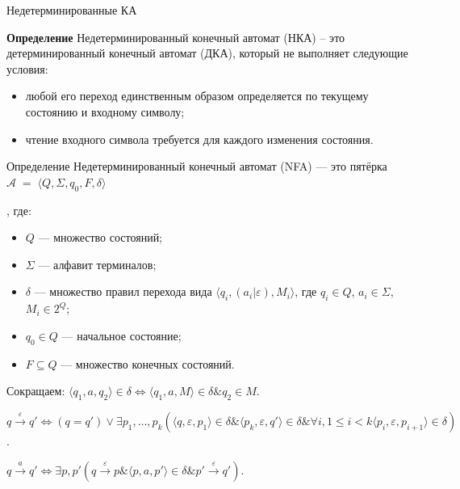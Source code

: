 \documentclass[mathserif]{beamer}
\def\logor{\mathrel{\vee}} %
\def\logand{\mathrel{\&}}
\def\iff{\mathrel{\Leftrightarrow}}
\newcommand{\empt}{\varepsilon} %
\def\Aut{\mathscr{A}}
\newcommand{\seq}{\;{=}\;}
\newenvironment{wideitemize}{\itemize\addtolength{\itemsep}{8pt}}{\enditemize}
\begin{document}
\begin{frame}{Недетерминированные КА} {\vspace{-5pt}}
    \vspace{-5pt}
     {
        \begin{block}{\bf Определение}
            Недетерминированный конечный автомат (НКА) -- это детерминированный конечный автомат (ДКА), который не выполняет следующие условия:
            \begin{itemize}
                \item любой его переход единственным образом определяется по текущему состоянию и входному символу;
                \item чтение входного символа требуется для каждого изменения состояния.
            \end{itemize}
        \end{block}
    }
     {
        \begin{block}{Определение}
            Недетерминированный конечный автомат (NFA) --- это пятёрка $\Aut\seq\langle Q,\Sigma, q_0, F, \delta \rangle${, где:
                    \begin{itemize}
                        \item $Q$ --- множество состояний;
                        \item $\Sigma$ --- алфавит терминалов;
                        \item $\delta$ --- множество правил перехода вида $\langle q_i, (a_i|\empt), M_i\rangle$, где $q_i\in Q$, $a_i\in \Sigma$, $M_i\in 2^Q$;
                        \item $q_0\in Q$ --- начальное состояние;
                        \item $F\subseteq Q$ --- множество конечных состояний.
                    \end{itemize}}
        \end{block}

        Сокращаем: $\langle q_1, a, q_2\rangle\in \delta\iff \langle q_1,a,M\rangle\in\delta\logand q_2\in M$.
    }
     {
        \begin{wideitemize}
            \item $q \overset{\empt}{\longrightarrow} q'\iff (q=q')\logor\exists p_1,\dots,p_{k}(\langle q,\empt, p_1\rangle\in \delta\logand \langle p_k,\empt,q'\rangle\in\delta\logand\forall i,1\leq i<k\langle p_i,\empt,p_{i+1}\rangle\in\delta)$.

            \item $q\overset{a}{\longrightarrow}q'\iff \exists p,p'(q\overset{\empt}{\longrightarrow}p\logand \langle p, a, p'\rangle\in\delta\logand p'\overset{\empt}{\longrightarrow}q')$.


\end{wideitemize}}
\end{frame}
\end{document}

